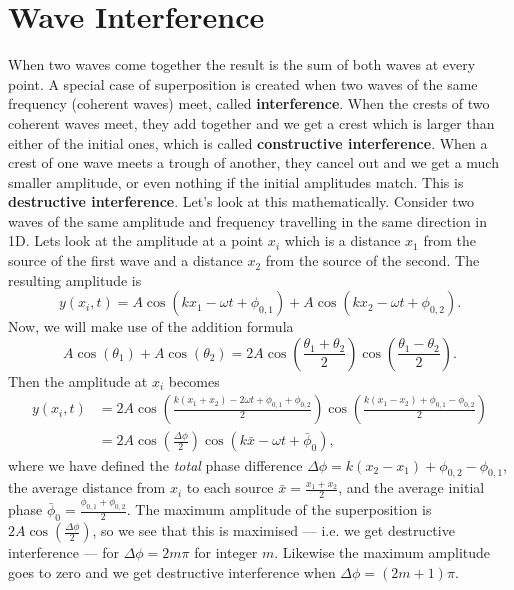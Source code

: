 \documentclass[../classical_mechanics.tex]{subfiles}
\begin{document}
    \section{Wave Interference}\label{sec:wave-interference}
        When two waves come together the result is the sum of both waves at every point.
        A special case of superposition is created when two waves of the same frequency (coherent waves) meet, called \textbf{interference}.
        When the crests of two coherent waves meet, they add together and we get a crest which is larger than either of the initial ones, which is called \textbf{constructive interference}.
        When a crest of one wave meets a trough of another, they cancel out and we get a much smaller amplitude, or even nothing if the initial amplitudes match.
        This is \textbf{destructive interference}.
        Let's look at this mathematically.
        Consider two waves of the same amplitude and frequency travelling in the same direction in 1D.
        Lets look at the amplitude at a point $x_i$ which is a distance $x_1$ from the source of the first wave and a distance $x_2$ from the source of the second.
        The resulting amplitude is
        \begin{equation}
            y(x_i,t)=A\cos(kx_1-\omega t+\phi_{0,1})+A\cos(kx_2-\omega t+\phi_{0,2}).
        \end{equation}
        Now, we will make use of the addition formula
        \begin{equation}
            A\cos(\theta_1)+A\cos(\theta_2)=2A\cos\left(\frac{\theta_1+\theta_2}{2}\right)\cos\left(\frac{\theta_1-\theta_2}{2}\right).
        \end{equation}
        Then the amplitude at $x_i$ becomes
        \begin{align}
            y(x_i,t)&=2A\cos\left(\frac{k(x_1+x_2)-2\omega t+\phi_{0,1}+\phi_{0,2}}{2}\right)\cos\left(\frac{k(x_1-x_2)+\phi_{0,1}-\phi_{0,2}}{2}\right)\\
            &=2A\cos\left(\frac{\Delta\phi}{2}\right)\cos(k\bar{x}-\omega t+\bar{\phi}_0),
        \end{align}
        where we have defined the \textit{total} phase difference $\Delta\phi=k(x_2-x_1)+\phi_{0,2}-\phi_{0,1}$, the average distance from $x_i$ to each source $\bar{x}=\frac{x_1+x_2}{2}$, and the average initial phase $\bar{\phi}_0=\frac{\phi_{0,1}+\phi_{0,2}}{2}$.
        The maximum amplitude of the superposition is $2A\cos\left(\frac{\Delta\phi}{2}\right)$, so we see that this is maximised --- i.e. we get destructive interference --- for $\Delta\phi=2m\pi$ for integer $m$.
        Likewise the maximum amplitude goes to zero and we get destructive interference when $\Delta\phi=(2m+1)\pi$.
\end{document}
